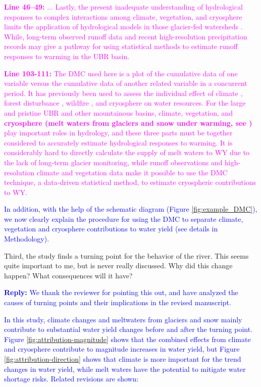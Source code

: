 \documentclass[11pt]{article}
\newcounter{reviewer}
\newcounter{point}[reviewer]
\renewcommand{\thepoint}{Comment\,\thereviewer.\arabic{point}:}
\newcommand{\point}[1]{\refstepcounter{point} \bigskip \noindent {\fontseries{b}\selectfont \thepoint} #1 \par}
\newcommand{\reply}[1]{\bigskip \textcolor{blue}{\noindent \textbf {Reply:} #1}}
\newcommand{\nextreply}[1]{\bigskip \textcolor{blue}{\noindent #1}}
\newcommand{\revised}[3][2]{\bigskip \textcolor{magenta}{\noindent \textbf{Line #2:} #3}}
\begin{document}
\revised{46--49}{... Lastly, the present inadequate understanding of hydrological responses to complex interactions among climate, vegetation, and cryosphere limits the application of hydrological models in those glacier-fed watersheds \citep{pellicciotti2012challenges}. While, long-term observed runoff data and recent high-resolution precipitation records may give a pathway for using statistical methods to estimate runoff responses to warming in the UBR basin.}

\revised{103-111}{The DMC used here is a plot of the cumulative data of one variable versus the cumulative data of another related variable in a concurrent period.
It has previously been used to assess the individual effect of climate \citep{gao2011changes}, forest disturbance \citep{wei2010quantifying}, wildfire \citep{hallema2018burned}, and cryosphere \citep{brahney2017determining} on water resources.
For the large and pristine UBR and other mountainous basins, climate, vegetation, and \textbf{cryosphere (melt waters from glaciers and snow under warming, see \citealt{biemans2019importance,huss2018global})} play important roles in hydrology, and these three parts must be together considered to accurately estimate hydrological responses to warming.
It is considerably hard to directly calculate the supply of melt waters to WY due to the lack of long-term glacier monitoring, while runoff observations and high-resolution climate and vegetation data make it possible to use the DMC technique, a data-driven statistical method, to estimate cryospheric contributions to WY.}

\nextreply{In addition, with the help of the schematic diagram (Figure \ref{fig:example_DMC}), we now clearly explain the procedure for using the DMC to separate climate, vegetation and cryosphere contributions to water yield (see details in Methodology).}

\point{Third, the study finds a turning point for the behavior of the river. This seems quite important to me, but is never really discussed. Why did this change happen? What consequences will it have?}

\reply{We thank the reviewer for pointing this out, and have analyzed the causes of turning points and their implications in the revised manuscript.}

\nextreply{In this study, climate changes and meltwaters from glaciers and snow mainly contribute to substantial water yield changes before and after the turning point. 
Figure \ref{fig:attribution-magnitude} shows that the combined effects from climate and cryosphere contribute to magnitude increases in water yield, but Figure \ref{fig:attribution-direction} shows that climate is more important for the trend changes in water yield, while melt waters have the potential to mitigate water shortage risks. Related revisions are shown:}
\end{document}
